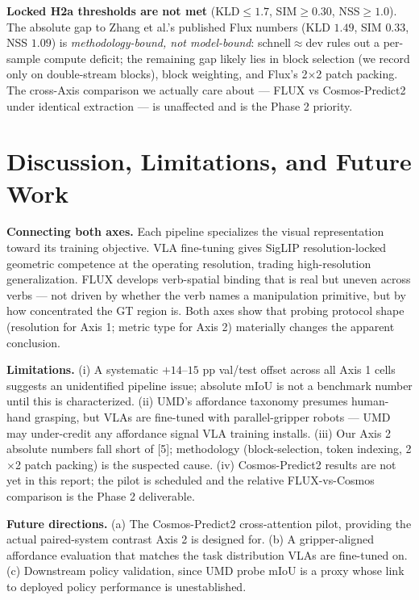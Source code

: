 \documentclass[11pt,letterpaper]{article}
\begin{document}
\textbf{Locked H2a thresholds are not met} (KLD${\leq}1.7$, SIM${\geq}0.30$, NSS${\geq}1.0$). The absolute gap to Zhang et al.'s published Flux numbers (KLD $1.49$, SIM $0.33$, NSS $1.09$) is \emph{methodology-bound, not model-bound}: schnell$\approx$dev rules out a per-sample compute deficit; the remaining gap likely lies in block selection (we record only on double-stream blocks), block weighting, and Flux's 2$\times$2 patch packing. The cross-Axis comparison we actually care about --- FLUX vs Cosmos-Predict2 under identical extraction --- is unaffected and is the Phase 2 priority.

\section{Discussion, Limitations, and Future Work}

\textbf{Connecting both axes.} Each pipeline specializes the visual representation toward its training objective. VLA fine-tuning gives SigLIP resolution-locked geometric competence at the operating resolution, trading high-resolution generalization. FLUX develops verb-spatial binding that is real but uneven across verbs --- not driven by whether the verb names a manipulation primitive, but by how concentrated the GT region is. Both axes show that probing protocol shape (resolution for Axis 1; metric type for Axis 2) materially changes the apparent conclusion.

\textbf{Limitations.} (i) A systematic $+14$--$15$ pp val/test offset across all Axis 1 cells suggests an unidentified pipeline issue; absolute mIoU is not a benchmark number until this is characterized. (ii) UMD's affordance taxonomy presumes human-hand grasping, but VLAs are fine-tuned with parallel-gripper robots --- UMD may under-credit any affordance signal VLA training installs. (iii) Our Axis 2 absolute numbers fall short of [5]; methodology (block-selection, token indexing, 2$\times$2 patch packing) is the suspected cause. (iv) Cosmos-Predict2 results are not yet in this report; the pilot is scheduled and the relative FLUX-vs-Cosmos comparison is the Phase 2 deliverable.

\textbf{Future directions.} (a) The Cosmos-Predict2 cross-attention pilot, providing the actual paired-system contrast Axis 2 is designed for. (b) A gripper-aligned affordance evaluation that matches the task distribution VLAs are fine-tuned on. (c) Downstream policy validation, since UMD probe mIoU is a proxy whose link to deployed policy performance is unestablished.
\end{document}
